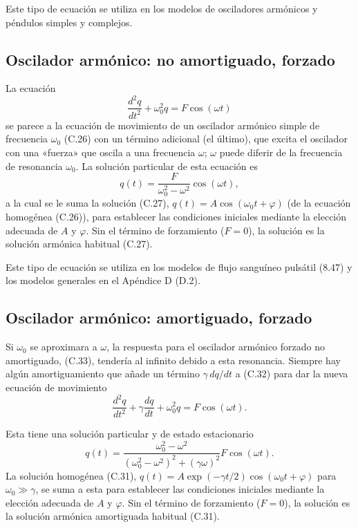 \documentclass[12pt,a4paper]{book}
\begin{document}
Este tipo de ecuación se utiliza en los modelos de osciladores armónicos y péndulos simples y complejos.

\subsection*{Oscilador armónico: no amortiguado, forzado}

La ecuación
\begin{equation}
\frac{d^2q}{dt^2} + \omega_0^2 q = F \cos(\omega t)
\label{eq:C.32}
\end{equation}
se parece a la ecuación de movimiento de un oscilador armónico simple de frecuencia $\omega_0$ (C.26) con un término adicional (el último), que excita el oscilador con una «fuerza» que oscila a una frecuencia $\omega$; $\omega$ puede diferir de la frecuencia de resonancia $\omega_0$. La solución particular de esta ecuación es
\begin{equation}
q(t) = \frac{F}{\omega_0^2 - \omega^2} \cos(\omega t),
\label{eq:C.33}
\end{equation}
a la cual se le suma la solución (C.27), $q(t) = A \cos(\omega_0 t + \varphi)$ (de la ecuación homogénea (C.26)), para establecer las condiciones iniciales mediante la elección adecuada de $A$ y $\varphi$. Sin el término de forzamiento ($F = 0$), la solución es la solución armónica habitual (C.27).

Este tipo de ecuación se utiliza en los modelos de flujo sanguíneo pulsátil (8.47) y los modelos generales en el Apéndice D (D.2).

\subsection*{Oscilador armónico: amortiguado, forzado}

Si $\omega_0$ se aproximara a $\omega$, la respuesta para el oscilador armónico forzado no amortiguado, (C.33), tendería al infinito debido a esta resonancia. Siempre hay algún amortiguamiento que añade un término $\gamma \, dq/dt$ a (C.32) para dar la nueva ecuación de movimiento
\begin{equation}
\frac{d^2q}{dt^2} + \gamma \frac{dq}{dt} + \omega_0^2 q = F \cos(\omega t).
\label{eq:C.34}
\end{equation}

Esta tiene una solución particular y de estado estacionario
\begin{equation}
q(t) = \frac{\omega_0^2 - \omega^2}{(\omega_0^2 - \omega^2)^2 + (\gamma\omega)^2} F \cos(\omega t).
\label{eq:C.35}
\end{equation}
La solución homogénea (C.31), $q(t) = A \exp(-\gamma t/2) \cos(\omega_0 t + \varphi)$ para $\omega_0 \gg \gamma$, se suma a esta para establecer las condiciones iniciales mediante la elección adecuada de $A$ y $\varphi$. Sin el término de forzamiento ($F = 0$), la solución es la solución armónica amortiguada habitual (C.31).
\end{document}
